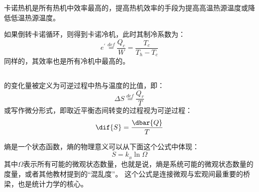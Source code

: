             卡诺热机是所有热机中效率最高的，提高热机效率的手段为提高高温热源温度或降低低温热源温度。
            
            如果倒转卡诺循环，则得到卡诺冷机，此时其制冷系数为：
            \begin{equation}
                e^{\prime} \overset{def}{=} \frac{Q_c}{W} = \frac{T_c}{T_h - T_c}
                \nonumber
            \end{equation}
            同样的，其效率也是所有冷机中最高的。
        \subsection[熵]{}
            的变化量被定义为可逆过程中热与温度的比值，即：
            \begin{equation}
                \Delta S \overset{def}{=} \frac{Q_r}{T} 
                \nonumber
            \end{equation}
            或写作微分形式，即取近平衡态间转变的过程视为可逆过程：
            \begin{equation}
                \dif{S} = \frac{\dbar{Q}}{T} 
                \nonumber
            \end{equation}
            
            熵是一个状态函数，熵的物理意义可以从下面这个公式中体现：
            \begin{equation}
                S = k_{_B}\ln\Omega
                \nonumber
            \end{equation}
            其中$\Omega$表示所有可能的微观状态数量，也就是说，熵是系统可能的微观状态数量的度量，或者其他教材提到的“混乱度”。
            这个公式是连接微观与宏观间最重要的桥梁，也是统计力学的核心。

